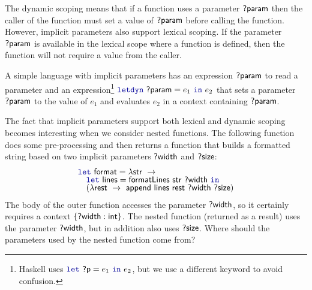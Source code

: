 The dynamic scoping means that if a function uses a parameter $\textnormal{\sffamily ?param}$ then the caller of the 
function must set a value of $\textnormal{\sffamily ?param}$ before calling the function. However, implicit 
parameters also support lexical scoping. If the parameter $\textnormal{\sffamily ?param}$ is available in the 
lexical scope where a function is defined, then the function will not require a value from the caller.

A simple language with implicit parameters has an expression $\textnormal{\sffamily ?param}$ to read a parameter 
and an expression\footnote{Haskell uses $\kvd{let}~\ident{?p} = e_1~\kvd{in}~e_2$, but we use a 
different keyword to avoid confusion.} $\kvd{letdyn}~\ident{?param} = e_1~\kvd{in}~e_2$ that sets a 
parameter $\textnormal{\sffamily ?param}$ to the value of $e_1$ and evaluates $e_2$ in a context containing 
$\textnormal{\sffamily ?param}$. 

The fact that implicit parameters support both lexical and dynamic scoping becomes interesting
when we consider nested functions. The following function does some pre-processing and then returns a 
function that builds a formatted string based on two implicit parameters $\textnormal{\sffamily ?width}$ and 
$\textnormal{\sffamily ?size}$:
%
\begin{equation*}
\begin{array}{l}
\kvd{let}~\ident{format} = \lambda \ident{str}~\rightarrow \\[-0.25em]
\quad \kvd{let}~\ident{lines} = \ident{formatLines}~\ident{str}~\ident{?width}~\kvd{in}\\[-0.25em]
\quad (\lambda \ident{rest}~\rightarrow~\ident{append}~
         \ident{lines}~\ident{rest}~\ident{?width}~\ident{?size})
\end{array}
\end{equation*}
%
The body of the outer function accesses the parameter $\textnormal{\sffamily ?width}$, so it certainly requires a context 
$\{ \textnormal{\sffamily ?width} : \textnormal{\sffamily int} \}$. The nested function (returned as a result) uses the parameter 
$\textnormal{\sffamily ?width}$, but in addition also uses $\textnormal{\sffamily ?size}$. Where should the parameters used by the 
nested function come from?

